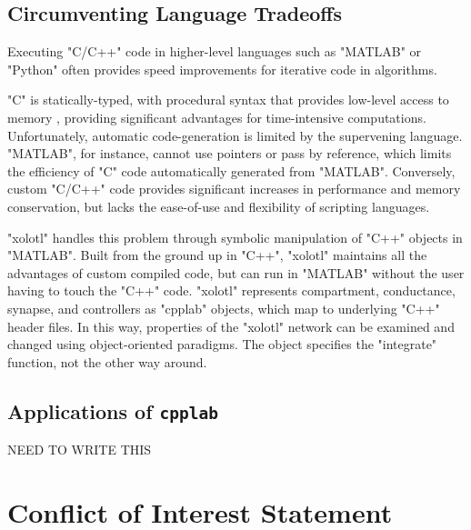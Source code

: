 \documentclass{frontiersSCNS} %
\begin{document}
\subsection{Circumventing Language Tradeoffs}

Executing "C/C++" code in higher-level languages such as "MATLAB" or "Python" often provides speed improvements for iterative code in algorithms. 

"C" is statically-typed, with procedural syntax that provides low-level access to memory \autocite{kernighanProgrammingLanguage1978}, providing significant advantages for time-intensive computations. Unfortunately, automatic code-generation is limited by the supervening language. "MATLAB", for instance, cannot use pointers or pass by reference, which limits the efficiency of "C" code automatically generated from "MATLAB". Conversely, custom "C/C++" code provides significant increases in performance and memory conservation, but lacks the ease-of-use and flexibility of scripting languages.

"xolotl" handles this problem through symbolic manipulation of "C++" objects in "MATLAB". Built from the ground up in "C++", "xolotl" maintains all the advantages of custom compiled code, but can run in "MATLAB" without the user having to touch the "C++" code. "xolotl" represents compartment, conductance, synapse, and controllers as "cpplab" objects, which map to underlying "C++" header files. In this way, properties of the "xolotl" network can be examined and changed using object-oriented paradigms. The object specifies the "integrate" function, not the other way around.

\subsection{Applications of \texttt{cpplab}}

NEED TO WRITE THIS




%
%
%
%
%
%


\section*{Conflict of Interest Statement}
\end{document}
